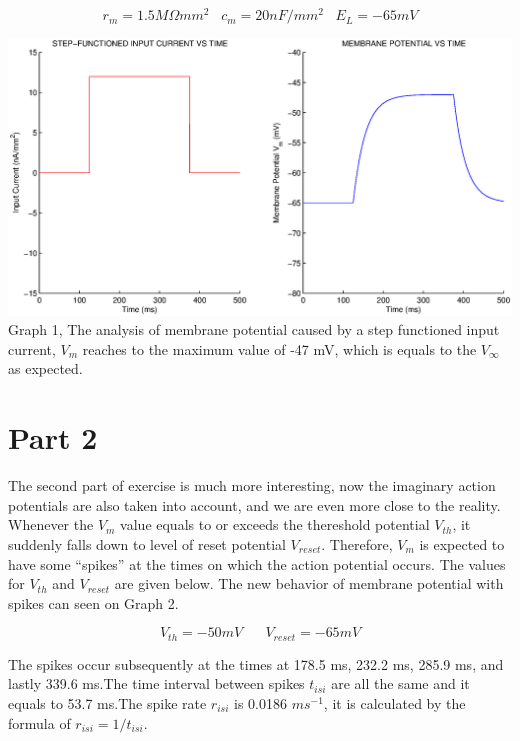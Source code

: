 \documentclass{article}
\begin{document}
\begin{equation*}
r_{m}=1.5 M \Omega mm^{2}\,\,\,\,\,c_{m}=20nF/mm^{2}\,\,\,\,\,E_{L}=-65mV
\end{equation*}

\begin{center}
 \includegraphics[width=\textwidth]{q7.eps}
Graph 1, The analysis of membrane potential caused by a step functioned input current, $V_{m}$ reaches to the maximum value of -47 mV, which is equals to the $V_{\infty}$ as expected.
\end{center}


\section*{Part 2}
The second part of exercise is much more interesting, now the imaginary action potentials are also taken into account, and we are even more close to the reality. Whenever the $V_{m}$ value equals to or exceeds the thereshold potential $V_{th}$, it suddenly falls down to level of reset potential $V_{reset}$. Therefore, $V_{m}$ is expected to have some ``spikes'' at the times on which the action potential occurs. The values for $V_{th}$ and $V_{reset}$ are given below. The new behavior of membrane potential with spikes can seen on Graph 2.

\begin{equation*}
V_{th}=-50 mV \,\,\,\,\,\,\,\,\,\,V_{reset}=-65 mV
\end{equation*}

The spikes occur subsequently at the times at 178.5 ms, 232.2 ms, 285.9 ms, and lastly 339.6 ms.The time interval between spikes $t_{isi}$ are all the same and it equals to 53.7 ms.The spike rate $r_{isi}$ is 0.0186 $ms^{-1}$, it is calculated by the formula of $r_{isi}=1/t_{isi}$.
\end{document}
